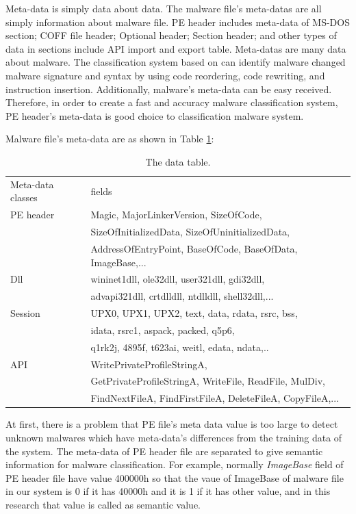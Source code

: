 Meta-data is simply data about data. The malware file's meta-datas are all simply information about malware file. PE header includes meta-data of MS-DOS section; COFF file header; Optional header; Section header; and other types of data in sections include API import and export table. Meta-datas are many data about malware. The classification system based on can identify malware changed malware signature and syntax by using code reordering, code rewriting, and instruction insertion. Additionally, malware's meta-data can be easy received. Therefore, in order to create a fast and accuracy malware classification system, PE header's meta-data is good choice to classification malware system. 

Malware file's meta-data are as shown in Table \ref{table:metadata}:
\begin{table}
\begin{center}
    \begin{tabular}{ | l | l |}
     \hline
    Meta-data classes & fields \\
  PE header & Magic, MajorLinkerVersion, SizeOfCode,\\
  & SizeOfInitializedData, SizeOfUninitializedData,  \\
 & AddressOfEntryPoint, BaseOfCode, BaseOfData, ImageBase,... \\ 
 \hline
	Dll &   wininet1dll, ole32dll, user321dll, gdi32dll,\\ 
	 & advapi321dll, crtdlldll, ntdlldll, shell32dll,...\\ 
	 \hline
	Session &  UPX0, UPX1, UPX2, text, data, rdata, rsrc, bss, \\
 & idata, rsrc1, aspack, packed, q5p6, \\
 & q1rk2j, 4895f, t623ai, weitl, edata, ndata,.. \\ 
 \hline
	API &  WritePrivateProfileStringA, \\
& GetPrivateProfileStringA, WriteFile, ReadFile, MulDiv,\\
& FindNextFileA, FindFirstFileA, DeleteFileA, CopyFileA,...\\  
 \hline
    \end{tabular}
	\end{center}
     \caption{The data table.}
    \label{table:metadata}
\end{table}

At first, there is a problem that PE file's meta data value is too large to detect unknown malwares which have meta-data's differences from the training data of the system. The meta-data of PE header file are separated  to give semantic information for malware classification. For example, normally \emph{ImageBase} field of PE header file have value 400000h \cite{goppit} so that the vaue of ImageBase of malware file in our system is 0 if it has 40000h and it is 1 if it has other value, and in this research that value is called as semantic value. 


